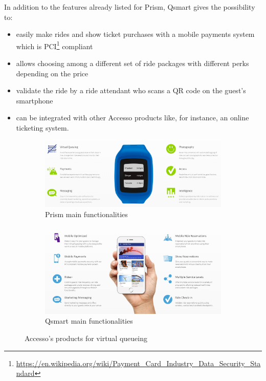 In addition to the features already listed for Prism, Qsmart gives the possibility to:

\begin{itemize}
	\item easily make rides and
	show ticket purchases with a mobile payments system which is
	PCI\footnote{\url{https://en.wikipedia.org/wiki/Payment_Card_Industry_Data_Security_Standard}} compliant
	\item allows choosing among a different set of ride packages with different perks depending on the price
	\item validate the ride by a ride attendant who scans a QR code on the guest's smartphone
	\item can be integrated with other Accesso products like, for instance, an online ticketing system.
	
\end{itemize}

\begin{figure}[H]
	\centering
	\begin{subfigure}[b]{0.85\textwidth}
		\centering
		\includegraphics[width=\textwidth]{img/prism}
		\caption{Prism main functionalities}
		\label{fig:prism}
	\end{subfigure}
	\hfill
	\begin{subfigure}[b]{0.85\textwidth}
		\centering
		\includegraphics[width=\textwidth]{img/qsmart}
		\caption{Qsmart main functionalities}
		\label{fig:qsmart}
	\end{subfigure}
	\caption{Accesso's products for virtual queueing\protect\footnotemark}
	\label{fig:prismart}
\end{figure}

